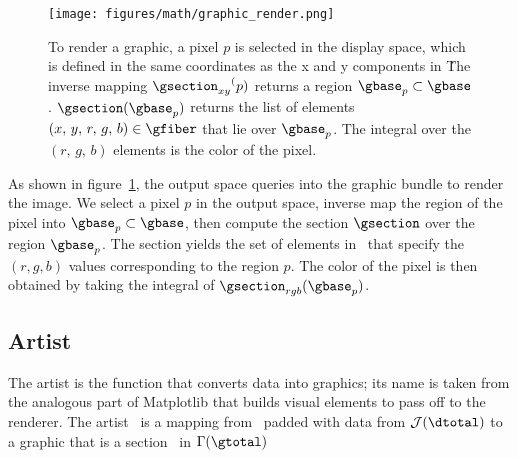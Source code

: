 \documentclass[../main.tex]{subfiles}
\begin{document}
\begin{figure}
    \texttt{[image: figures/math/graphic\_render.png]}
    \caption{To render a graphic, a pixel $p$ is selected in the display space, which is defined in the same coordinates as the x and y components in \gfiber\.  The inverse mapping ${\gsection_{xy}}^(p)$ returns a region $\gbase_{p} \subset \gbase$. $\gsection(\gbase_{p})$ returns the list of elements $(x,\,y,\,r,\,g,\,b) \in \gfiber$ that lie over $\gbase_{p}$. The integral over the $(r,\,g,\,b)$ elements is the color of the pixel.}
    \label{fig:graphic_rho_lookup}
\end{figure}
As shown in figure~\ref{fig:graphic_rho_lookup}, the output space queries into the graphic bundle to render the image. We select a pixel $p$ in the output space, inverse map the region of the pixel into $\gbase_p \subset \gbase$, then compute the section $\gsection$ over the region $\gbase_p$. The section yields the set of elements in \gfiber\ that specify the $(r, g, b)$ values corresponding to the region $p$. The color of the pixel is then obtained by taking the integral of $\gsection_{rgb}(\gbase_p)$. 


\subsection{Artist}
\label{sec:artist}
The artist is the function that converts data into graphics; its name is taken from the analogous part of Matplotlib\cite{hunterArchitectureOpenSource} that builds visual elements to pass off to the renderer. The artist \vartist\ is a mapping from \dtotal\ padded with data from $\mathcal{J}(\dtotal)$ to a graphic that is a section \gsection\ in  $\Gamma(\gtotal)$
\end{document}
